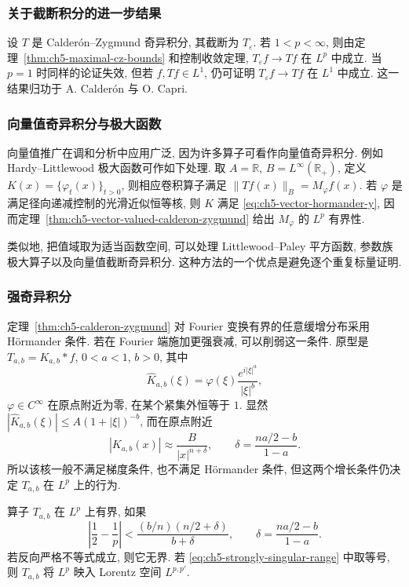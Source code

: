 \subsubsection{关于截断积分的进一步结果}
\label{subsec:ch5-more-truncated-integrals}

设 $T$ 是 Calderón--Zygmund 奇异积分, 其截断为 $T_\varepsilon$. 若 $1<p<\infty$, 则由定理~\ref{thm:ch5-maximal-cz-bounds} 和控制收敛定理, $T_\varepsilon f\to Tf$ 在 $L^p$ 中成立. 当 $p=1$ 时同样的论证失效, 但若 $f,Tf\in L^1$, 仍可证明 $T_\varepsilon f\to Tf$ 在 $L^1$ 中成立. 这一结果归功于 A. Calderón 与 O. Capri.

\hypertarget{chapter-05-page-123}{}
\subsubsection{向量值奇异积分与极大函数}
\label{subsec:ch5-vector-valued-singular-maximal}

向量值推广在调和分析中应用广泛, 因为许多算子可看作向量值奇异积分. 例如 Hardy--Littlewood 极大函数可作如下处理. 取 $A=\mathbb R$, $B=L^\infty(\mathbb R_+)$, 定义 $K(x)=\{\varphi_t(x)\}_{t>0}$, 则相应卷积算子满足 $\|Tf(x)\|_B=M_\varphi f(x)$. 若 $\varphi$ 是满足径向递减控制的光滑近似恒等核, 则 $K$ 满足 \eqref{eq:ch5-vector-hormander-y}, 因而定理~\ref{thm:ch5-vector-valued-calderon-zygmund} 给出 $M_\varphi$ 的 $L^p$ 有界性.

类似地, 把值域取为适当函数空间, 可以处理 Littlewood--Paley 平方函数, 参数族极大算子以及向量值截断奇异积分. 这种方法的一个优点是避免逐个重复标量证明.

\hypertarget{chapter-05-page-124}{}
\subsubsection{强奇异积分}
\label{subsec:ch5-strongly-singular-integrals}

定理~\ref{thm:ch5-calderon-zygmund} 对 Fourier 变换有界的任意缓增分布采用 Hörmander 条件. 若在 Fourier 端施加更强衰减, 可以削弱这一条件. 原型是 $T_{a,b}=K_{a,b}*f$, $0<a<1$, $b>0$, 其中
\[
 \widehat K_{a,b}(\xi)=\varphi(\xi)\frac{e^{i|\xi|^a}}{|\xi|^b},
\]
$\varphi\in C^\infty$ 在原点附近为零, 在某个紧集外恒等于 $1$. 显然 $|\widehat K_{a,b}(\xi)|\le A(1+|\xi|)^{-b}$, 而在原点附近
\[
 |K_{a,b}(x)|\approx\frac B{|x|^{n+\delta}},
 \qquad \delta=\frac{na/2-b}{1-a}.
\]
所以该核一般不满足梯度条件, 也不满足 Hörmander 条件, 但这两个增长条件仍决定 $T_{a,b}$ 在 $L^p$ 上的行为.

\begin{Theorem}
\label{thm:ch5-strongly-singular-model}
算子 $T_{a,b}$ 在 $L^p$ 上有界, 如果
\begin{equation}
\label{eq:ch5-strongly-singular-range}
 \left|\frac12-\frac1p\right|
 <\frac{(b/n)(n/2+\delta)}{b+\delta},
 \qquad \delta=\frac{na/2-b}{1-a}.
\end{equation}
若反向严格不等式成立, 则它无界. 若 \eqref{eq:ch5-strongly-singular-range} 中取等号, 则 $T_{a,b}$ 将 $L^p$ 映入 Lorentz 空间 $L^{p,p'}$.
\end{Theorem}

